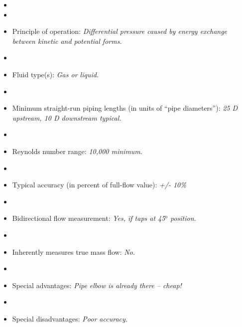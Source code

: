 \documentclass[12pt,a4paper]{article}
\begin{document}
\begin{itemize}
\goodbreak
\item{} 
\vskip 5pt
\item\item{} Principle of operation: {\it Differential pressure caused by energy exchange between kinetic and potential forms.}
\vskip 5pt
\item\item{} Fluid type(s): {\it Gas or liquid.}
\vskip 5pt
\item\item{} Minimum straight-run piping lengths (in units of ``pipe diameters''): {\it 25 D upstream, 10 D downstream typical.}
\vskip 5pt
\item\item{} Reynolds number range: {\it 10,000 minimum.}
\vskip 5pt
\item\item{} Typical accuracy (in percent of full-flow value): {\it +/- 10\%}
\vskip 5pt
\item\item{} Bidirectional flow measurement: {\it Yes, if taps at 45$^{o}$ position.}
\vskip 5pt
\item\item{} Inherently measures true mass flow: {\it No.}
\vskip 5pt
\item\item{} Special advantages: {\it Pipe elbow is already there -- cheap!}
\vskip 5pt
\item\item{} Special disadvantages: {\it Poor accuracy.}
\end{itemize}
\end{document}
